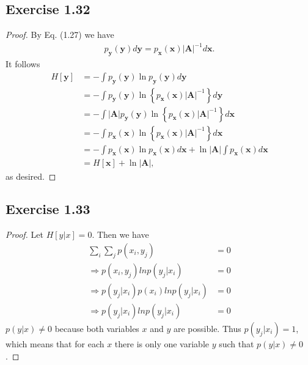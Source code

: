\documentclass[11pt]{article}
\theoremstyle{definition}
\begin{document}
\subsection{Exercise 1.32}
\begin{proof}
By Eq. (1.27) we have
\begin{align*}
p_{\textbf{y}}(\textbf{y})d\textbf{y}  = p_{\textbf{x}}(\textbf{x})|\textbf{A}|^{-1}d\textbf{x}.
\end{align*}
It follows
\begin{align*}
H[\textbf{y}] &= -\int p_{\textbf{y}}(\textbf{y})\ln p_{\textbf{y}}(\textbf{y})d\textbf{y} \\
&= -\int p_{\textbf{y}}(\textbf{y})\ln\left\{p_{\textbf{x}}(\textbf{x})|\textbf{A}|^{-1}\right\} d\textbf{y} \\
&= -\int |\textbf{A}|p_{\textbf{y}}(\textbf{y})\ln\left\{p_{\textbf{x}}(\textbf{x})|\textbf{A}|^{-1}\right\} d\textbf{x} \\
&= -\int p_{\textbf{x}}(\textbf{x})\ln\left\{p_{\textbf{x}}(\textbf{x})|\textbf{A}|^{-1}\right\} d\textbf{x} \\
&= -\int p_{\textbf{x}}(\textbf{x})\ln p_{\textbf{x}}(\textbf{x})d\textbf{x} + \ln|\textbf{A}|\int p_{\textbf{x}}(\textbf{x})d\textbf{x} \\
&= H[\textbf{x}] + \ln|\textbf{A}|,
\end{align*}
as desired.
\end{proof}

\subsection{Exercise 1.33}
\begin{proof}
Let $H[y|x] = 0$. Then we have
\begin{align*}
\sum_i\sum_jp(x_i,y_j) &= 0 \\
\Rightarrow p(x_i,y_j)lnp(y_j|x_i) &= 0\\
\Rightarrow p(y_j|x_i)p(x_i)lnp(y_j|x_i) &= 0\\
\Rightarrow p(y_j|x_i)lnp(y_j|x_i) &= 0
\end{align*}
$p(y|x) \not = 0$ because both variables $x$ and $y$ are possible. Thus $p(y_j|x_i) = 1$, which means that for each $x$ there is only one variable $y$ such that $p(y|x) \not = 0$.
\end{proof}
\end{document}
